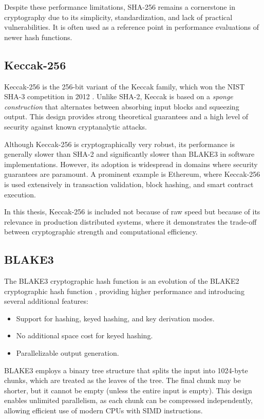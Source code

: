 Despite these performance limitations, SHA-256 remains a cornerstone in cryptography due to its simplicity, standardization, and lack of practical vulnerabilities. It is often used as a reference point in performance evaluations of newer hash functions.

\subsection{Keccak-256}

Keccak-256 \cite{bertoni2013keccak} is the 256-bit variant of the Keccak family, which won the NIST SHA-3 competition in 2012 \cite{nist-sha3}. Unlike SHA-2, Keccak is based on a \emph{sponge construction} that alternates between absorbing input blocks and squeezing output. This design provides strong theoretical guarantees and a high level of security against known cryptanalytic attacks.  

Although Keccak-256 is cryptographically very robust, its performance is generally slower than SHA-2 and significantly slower than BLAKE3 in software implementations. However, its adoption is widespread in domains where security guarantees are paramount. A prominent example is Ethereum, where Keccak-256 is used extensively in transaction validation, block hashing, and smart contract execution.  

In this thesis, Keccak-256 is included not because of raw speed but because of its relevance in production distributed systems, where it demonstrates the trade-off between cryptographic strength and computational efficiency.

\subsection{BLAKE3}

The BLAKE3 cryptographic hash function \cite{blake3-oconnor} is an evolution of the BLAKE2 cryptographic hash function \cite{aumasson2013blake2}, providing higher performance and introducing several additional features:
\begin{itemize}
    \item Support for hashing, keyed hashing, and key derivation modes.
    \item No additional space cost for keyed hashing.
    \item Parallelizable output generation.
\end{itemize}

BLAKE3 employs a binary tree structure that splits the input into 1024-byte chunks, which are treated as the leaves of the tree. The final chunk may be shorter, but it cannot be empty (unless the entire input is empty). This design enables unlimited parallelism, as each chunk can be compressed independently, allowing efficient use of modern CPUs with SIMD instructions.

